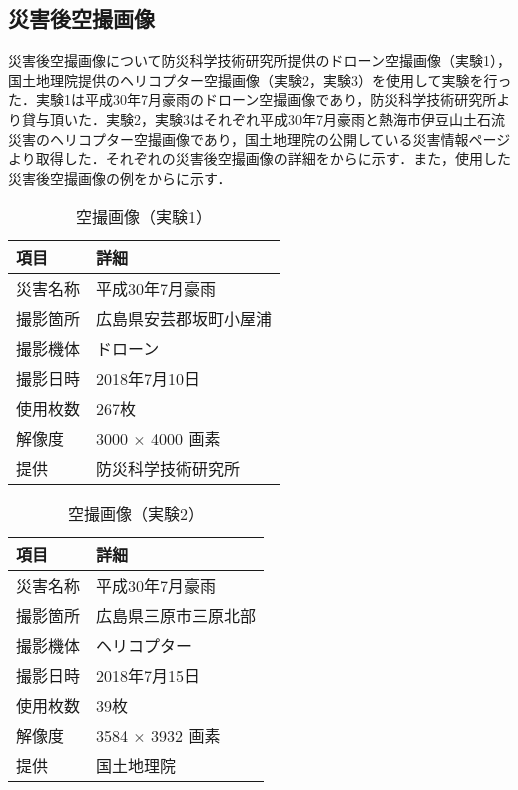     \subsection*{災害後空撮画像}
      災害後空撮画像について防災科学技術研究所提供のドローン空撮画像\cite{防災科研空撮画像}（実験1），国土地理院提供のヘリコプター空撮画像\cite{国土地理院空撮画像1, 国土地理院空撮画像2}（実験2，実験3）を使用して実験を行った．実験1は平成30年7月豪雨のドローン空撮画像であり，防災科学技術研究所より貸与頂いた．実験2，実験3はそれぞれ平成30年7月豪雨と熱海市伊豆山土石流災害のヘリコプター空撮画像であり，国土地理院の公開している災害情報ページより取得した．それぞれの災害後空撮画像の詳細をからに示す．また，使用した災害後空撮画像の例をからに示す．

      \begin{table}[tbp]
        \centering
        \caption{空撮画像（実験1）}
        \label{空撮画像（実験1）}
        \begin{tabular}{ll}
          \hline
          \textbf{項目} & \textbf{詳細} \\
          \hline \hline
          災害名称 & 平成30年7月豪雨 \\
          撮影箇所 & 広島県安芸郡坂町小屋浦 \\
          撮影機体 & ドローン \\
          撮影日時 & 2018年7月10日 \\
          使用枚数 & 267枚 \\
          解像度 & 3000 $\times$ 4000 画素 \\
          提供 & 防災科学技術研究所 \\ \hline
        \end{tabular}
      \end{table}

      \begin{table}[tbp]
        \centering
        \caption{空撮画像（実験2）}
        \begin{tabular}{ll}
          \hline
          \textbf{項目} & \textbf{詳細} \\
          \hline \hline
          災害名称 & 平成30年7月豪雨 \\
          撮影箇所 & 広島県三原市三原北部 \\
          撮影機体 & ヘリコプター \\
          撮影日時 & 2018年7月15日 \\
          使用枚数 & 39枚 \\
          解像度 & 3584 $\times$ 3932 画素 \\
          提供 & 国土地理院 \\ \hline
        \end{tabular}
      \end{table}

